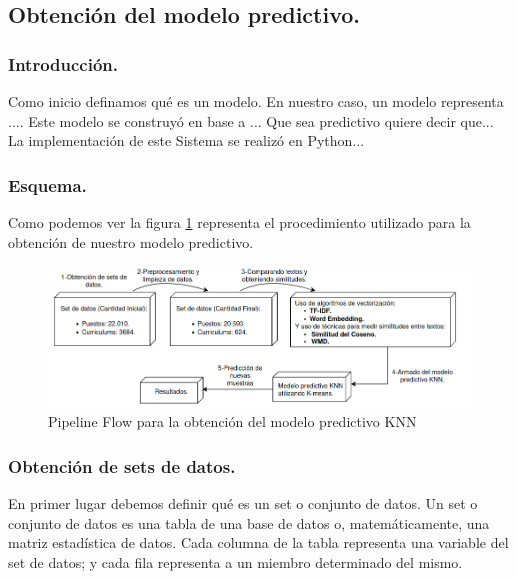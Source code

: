 \documentclass[12pt,a4paper]{article}
\begin{document}
\cleardoublepage

\subsection{Obtención del modelo predictivo.}\label{5.1.Obtenciondelmodelopredictivo}

\subsubsection{Introducción.}
Como inicio definamos qué es un modelo. En nuestro caso, un modelo representa ....
Este modelo se construyó en base a ...
Que sea predictivo quiere decir que...
La implementación de este Sistema se realizó en Python...

\subsubsection{Esquema.}
Como podemos ver la figura \ref{fig:FlowCoreSystem} representa el procedimiento utilizado para la obtención de nuestro modelo predictivo. 

\begin{figure}[H]    %
  \centering
  \includegraphics[width=1\textwidth]{images/flow-core.png} 	%
  \caption{Pipeline Flow para la obtención del modelo predictivo KNN}  
  \label{fig:FlowCoreSystem}
\end{figure}

\cleardoublepage

\subsubsection{Obtención de sets de datos.}
En primer lugar debemos definir qué es un set o conjunto de datos.
Un set o conjunto de datos es una tabla de una base de datos o, matemáticamente, una matriz estadística de datos. Cada columna de la tabla representa una variable del set de datos; y cada fila representa a un miembro determinado del mismo.
\end{document}
